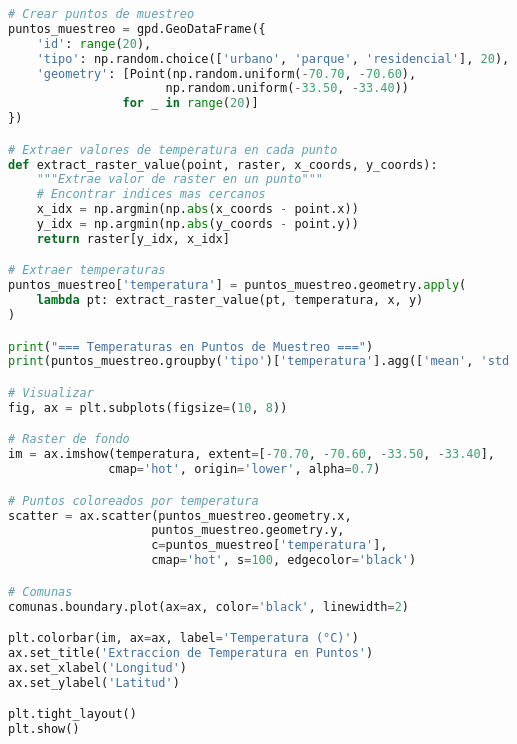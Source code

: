 \documentclass[11pt,a4paper]{article}
\begin{document}
\begin{lstlisting}[language=Python]
# Crear puntos de muestreo
puntos_muestreo = gpd.GeoDataFrame({
    'id': range(20),
    'tipo': np.random.choice(['urbano', 'parque', 'residencial'], 20),
    'geometry': [Point(np.random.uniform(-70.70, -70.60),
                      np.random.uniform(-33.50, -33.40)) 
                for _ in range(20)]
})

# Extraer valores de temperatura en cada punto
def extract_raster_value(point, raster, x_coords, y_coords):
    """Extrae valor de raster en un punto"""
    # Encontrar indices mas cercanos
    x_idx = np.argmin(np.abs(x_coords - point.x))
    y_idx = np.argmin(np.abs(y_coords - point.y))
    return raster[y_idx, x_idx]

# Extraer temperaturas
puntos_muestreo['temperatura'] = puntos_muestreo.geometry.apply(
    lambda pt: extract_raster_value(pt, temperatura, x, y)
)

print("=== Temperaturas en Puntos de Muestreo ===")
print(puntos_muestreo.groupby('tipo')['temperatura'].agg(['mean', 'std']))

# Visualizar
fig, ax = plt.subplots(figsize=(10, 8))

# Raster de fondo
im = ax.imshow(temperatura, extent=[-70.70, -70.60, -33.50, -33.40],
              cmap='hot', origin='lower', alpha=0.7)

# Puntos coloreados por temperatura
scatter = ax.scatter(puntos_muestreo.geometry.x,
                    puntos_muestreo.geometry.y,
                    c=puntos_muestreo['temperatura'],
                    cmap='hot', s=100, edgecolor='black')

# Comunas
comunas.boundary.plot(ax=ax, color='black', linewidth=2)

plt.colorbar(im, ax=ax, label='Temperatura (°C)')
ax.set_title('Extraccion de Temperatura en Puntos')
ax.set_xlabel('Longitud')
ax.set_ylabel('Latitud')

plt.tight_layout()
plt.show()
\end{lstlisting}
\end{document}
